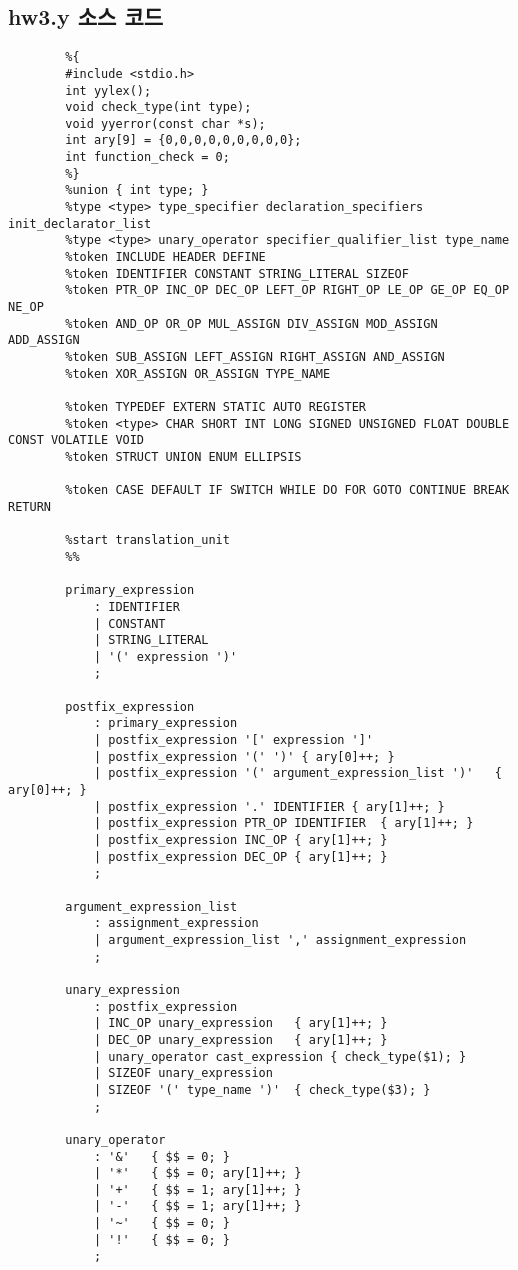 \documentclass{article}
\begin{document}
\subsection{hw3.y 소스 코드}
\begin{lstlisting}
		%{
		#include <stdio.h>
		int yylex();
		void check_type(int type);
		void yyerror(const char *s);
		int ary[9] = {0,0,0,0,0,0,0,0,0};
		int function_check = 0;
		%}
		%union { int type; }
		%type <type> type_specifier declaration_specifiers init_declarator_list
		%type <type> unary_operator specifier_qualifier_list type_name
		%token INCLUDE HEADER DEFINE
		%token IDENTIFIER CONSTANT STRING_LITERAL SIZEOF
		%token PTR_OP INC_OP DEC_OP LEFT_OP RIGHT_OP LE_OP GE_OP EQ_OP NE_OP
		%token AND_OP OR_OP MUL_ASSIGN DIV_ASSIGN MOD_ASSIGN ADD_ASSIGN
		%token SUB_ASSIGN LEFT_ASSIGN RIGHT_ASSIGN AND_ASSIGN
		%token XOR_ASSIGN OR_ASSIGN TYPE_NAME
		
		%token TYPEDEF EXTERN STATIC AUTO REGISTER
		%token <type> CHAR SHORT INT LONG SIGNED UNSIGNED FLOAT DOUBLE CONST VOLATILE VOID
		%token STRUCT UNION ENUM ELLIPSIS
		
		%token CASE DEFAULT IF SWITCH WHILE DO FOR GOTO CONTINUE BREAK RETURN
		
		%start translation_unit
		%%
		
		primary_expression
			: IDENTIFIER
			| CONSTANT
			| STRING_LITERAL
			| '(' expression ')'
			;
		
		postfix_expression
			: primary_expression
			| postfix_expression '[' expression ']'
			| postfix_expression '(' ')' { ary[0]++; }
			| postfix_expression '(' argument_expression_list ')'	{ ary[0]++; }
			| postfix_expression '.' IDENTIFIER	{ ary[1]++; }
			| postfix_expression PTR_OP IDENTIFIER	{ ary[1]++; }
			| postfix_expression INC_OP	{ ary[1]++; }
			| postfix_expression DEC_OP	{ ary[1]++; }
			;
		
		argument_expression_list
			: assignment_expression
			| argument_expression_list ',' assignment_expression
			;
		
		unary_expression
			: postfix_expression
			| INC_OP unary_expression	{ ary[1]++; }
			| DEC_OP unary_expression	{ ary[1]++; }
			| unary_operator cast_expression { check_type($1); }
			| SIZEOF unary_expression
			| SIZEOF '(' type_name ')'	{ check_type($3); }
			;
		
		unary_operator
			: '&'	{ $$ = 0; }
			| '*'	{ $$ = 0; ary[1]++; }
			| '+'	{ $$ = 1; ary[1]++; }
			| '-'	{ $$ = 1; ary[1]++; }
			| '~'	{ $$ = 0; }
			| '!'	{ $$ = 0; }
			;
		

\end{lstlisting}
\end{document}

